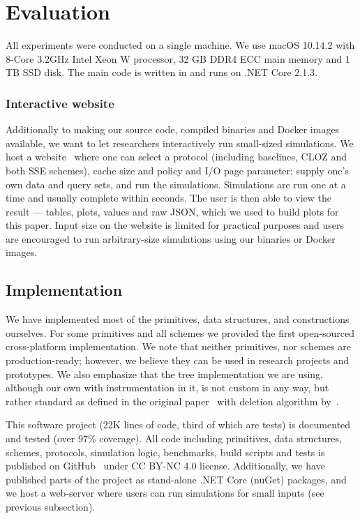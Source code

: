 \section{Evaluation}\label{sec:evaluation}

	All experiments were conducted on a single machine.
	We use macOS 10.14.2 with 8-Core 3.2GHz Intel Xeon W processor, 32 GB DDR4 ECC main memory and 1 TB SSD disk.
	The main code is written in {\Csharp} and runs on {.NET Core 2.1.3}.

	\subsubsection*{Interactive website}\label{sec:website}

		Additionally to making our source code, compiled binaries and Docker images available, we want to let researchers interactively run small-sized simulations.
		We host a website~\cite{ore-website} where one can select a protocol (including baselines, CLOZ and both SSE schemes), cache size and policy and I/O page parameter; supply one's own data and query sets, and run the simulations.
		Simulations are run one at a time and usually complete within seconds.
		The user is then able to view the result --- tables, plots, values and raw JSON, which we used to build plots for this paper.
		Input size on the website is limited for practical purposes and users are encouraged to run arbitrary-size simulations using our binaries or Docker images.

		

	\subsection{Implementation}

		We have implemented most of the primitives, data structures, and constructions ourselves.
		For some primitives and all schemes we provided the first open-sourced cross-platform {\Csharp} implementation.
		We note that neither primitives, nor schemes are production-ready; however, we believe they can be used in research projects and prototypes.
		We also emphasize that the {\BPlus} tree implementation we are using, although our own with instrumentation in it, is not custom in any way, but rather standard as defined in the original paper~\cite{b-tree} with deletion algorithm by~\cite{b-plus-tree-deletion}.

		This software project (22K lines of code, third of which are tests) is documented and tested (over 97\% coverage).
		All code including primitives, data structures, schemes, protocols, simulation logic, benchmarks, build scripts and tests is published on GitHub~\cite{ore-project} under CC BY-NC 4.0 license.
		Additionally, we have published parts of the project as stand-alone {.NET Core} (nuGet) packages, and we host a web-server where users can run simulations for small inputs (see previous subsection).

